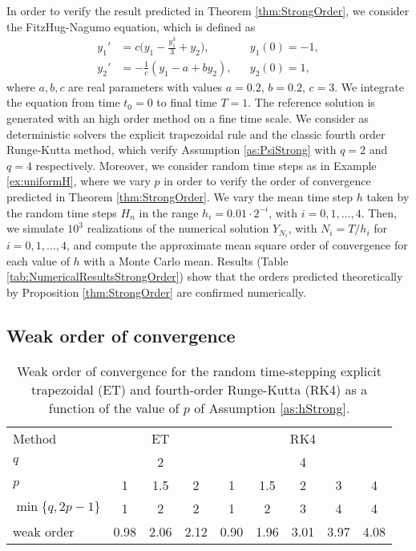 \documentclass{siamart1116}
\numberwithin{theorem}{section}
\begin{document}
In order to verify the result predicted in Theorem \ref{thm:StrongOrder}, we consider the FitzHug-Nagumo equation, which is defined as
\begin{equation}\label{eq:FitzNag}
\begin{aligned}
y_1' &= c\big(y_1 - \frac{y_1^3}{3} + y_2\big), && y_1(0) = -1, \\
y_2' &= -\frac{1}{c}(y_1 - a + by_2), && y_2(0) = 1,
\end{aligned}
\end{equation}
where $a, b, c$ are real parameters with values $a = 0.2$, $b = 0.2$, $c = 3$. We integrate the equation from time $t_0 = 0$ to final time $T = 1$. The reference solution is generated with an high order method on a fine time scale. We consider as deterministic solvers the explicit trapezoidal rule and the classic fourth order Runge-Kutta method, which verify Assumption \ref{as:PsiStrong} with $q = 2$ and $q = 4$ respectively. Moreover, we consider random time steps as in Example \ref{ex:uniformH}, where we vary $p$ in order to verify the order of convergence predicted in Theorem \ref{thm:StrongOrder}. We vary the mean time step $h$ taken by the random time steps $H_n$ in the range $h_i = 0.01\cdot 2^{-i}$, with $i = 0, 1, \ldots, 4$. Then, we simulate $10^3$ realizations of the numerical solution $Y_{N_i}$, with $N_i = T / h_i$ for $i = 0, 1, \ldots, 4$, and compute the approximate mean square order of convergence for each value of $h$ with a Monte Carlo mean. Results (Table \ref{tab:NumericalResultsStrongOrder}) show that the orders predicted theoretically by Proposition \ref{thm:StrongOrder} are confirmed numerically. 

\subsection{Weak order of convergence}

\begin{table}[t]
	\centering
	\begin{tabular}{l|ccc|ccccc}
		\toprule
		Method & \multicolumn{3}{c|}{ET} & \multicolumn{5}{c}{RK4} \\ 
		\cmidrule(l{2pt}r{2pt}){2-4} \cmidrule(l{2pt}r{2pt}){5-9} 
		$q$ & \multicolumn{3}{c|}{2} & \multicolumn{5}{c}{4} \\
		$p$ & 1 & 1.5 & 2 & 1 & 1.5 & 2 & 3 & 4\\
		$\min\{q, 2p - 1\}$ & 1 & 2 & 2 & 1 & 2 & 3 & 4 & 4 \\
		weak order & 0.98 & 2.06 & 2.12 & 0.90 & 1.96 & 3.01 & 3.97 & 4.08 \\
		\bottomrule
	\end{tabular}
	\caption{Weak order of convergence for the random time-stepping explicit trapezoidal (ET) and fourth-order Runge-Kutta (RK4) as a function of the value of $p$ of Assumption \ref{as:hStrong}.}
	\label{tab:NumericalResultsWeakOrder}
\end{table}
\end{document}
